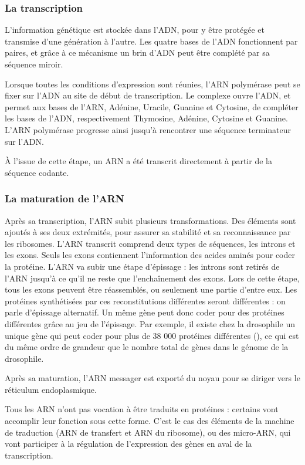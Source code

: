 \subsubsection{La transcription}

L'information génétique est stockée dans l'ADN, pour y être protégée et transmise d'une génération à l'autre. Les quatre bases de l'ADN fonctionnent par paires, et grâce à ce mécanisme un brin d'ADN peut être complété par sa séquence miroir. 

Lorsque toutes les conditions d'expression sont réunies, l'ARN polymérase peut se fixer sur l'ADN au site de début de transcription. Le complexe ouvre l'ADN, et permet aux bases de l'ARN, Adénine, Uracile, Guanine et Cytosine, de compléter les bases de l'ADN, respectivement Thymosine, Adénine, Cytosine et Guanine. L'ARN polymérase progresse ainsi jusqu'à rencontrer une séquence terminateur sur l'ADN. 

À l'issue de cette étape, un ARN a été transcrit directement à partir de la séquence codante. 

\subsubsection{La maturation de l'ARN}

Après sa transcription, l'ARN subit plusieurs transformations. Des éléments sont ajoutés à ses deux extrémités, pour assurer sa stabilité et sa reconnaissance par les ribosomes. 
L'ARN transcrit comprend deux types de séquences, les introns et les exons. Seuls les exons contiennent l'information des acides aminés pour coder la protéine. 
L'ARN va subir une étape d'épissage : les introns sont retirés de l'ARN jusqu'à ce qu'il ne reste que l'enchaînement des exons. Lors de cette étape, tous les exons peuvent être réassemblés, ou seulement une partie d'entre eux. Les protéines synthétisées par ces reconstitutions différentes seront différentes : on parle d'épissage alternatif. 
Un même gène peut donc coder pour des protéines différentes grâce au jeu de l'épissage. Par exemple, il existe chez la drosophile un unique gène qui peut coder pour plus de 38 000 protéines différentes (\cite{schmucker_drosophila_2000}), ce qui est du même ordre de grandeur que le nombre total de gènes dans le génome de la drosophile. 

Après sa maturation, l'ARN messager est exporté du noyau pour se diriger vers le réticulum endoplasmique.

Tous les ARN n'ont pas vocation à être traduits en protéines : certains vont accomplir leur fonction sous cette forme. C'est le cas des éléments de la machine de traduction (ARN de transfert et ARN du ribosome), ou des micro-ARN, qui vont participer à la régulation de l'expression des gènes en aval de la transcription.

